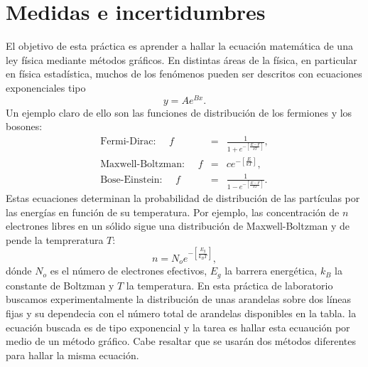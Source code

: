\chapter{Medidas e incertidumbres}\label{p1}

El objetivo de esta pr\'actica es aprender a hallar la ecuaci\'on matem\'atica 
de una ley f\'isica mediante m\'etodos gr\'aficos. En distintas \'areas de la 
f\'isica, en particular en f\'isica estad\'istica, muchos de los fen\'omenos 
pueden ser descritos con ecuaciones exponenciales tipo
\begin{equation*}
 y = A e^{Bx}.
\end{equation*}
Un ejemplo claro de ello son las funciones de distribuci\'on de los fermiones y 
los bosones:
\begin{eqnarray*}
 \text{Fermi-Dirac: } \quad f &=&\frac{1}{1+e^{-[\frac{E-F}{kT}]}}, \\
 \text{Maxwell-Boltzman: } \quad f &=& c e^{-[\frac{E}{kT}]}, \\
 \text{Bose-Einstein: } \quad f &=&\frac{1}{1-e^{-[\frac{E-F}{kT}]}}.
\end{eqnarray*}
Estas ecuaciones determinan la probabilidad de distribuci\'on de las 
part\'iculas por las energ\'ias en funci\'on de su temperatura. Por ejemplo, 
las concentraci\'on de $n$ electrones libres en un s\'olido sigue una 
distribuci\'on de Maxwell-Boltzman y de pende la tempreratura $T$:
\begin{equation*}
 n = N_o e^{-\left[\frac{E_g}{k_B T}\right]},
\end{equation*}
d\'onde $N_o$ es el n\'umero de electrones efectivos, $E_g$ la barrera 
energ\'etica, $k_B$ la constante de Boltzman y $T$ la temperatura. 
En esta pr\'actica de laboratorio buscamos experimentalmente la distribuci\'on 
de unas arandelas sobre dos l\'ineas fijas y su dependecia con el n\'umero 
total de arandelas disponibles en la tabla. la ecuaci\'on buscada es de tipo 
exponencial y la tarea es hallar esta ecuauci\'on por medio de un m\'etodo 
gr\'afico. Cabe resaltar que se usar\'an dos m\'etodos diferentes para hallar 
la misma ecuaci\'on.
